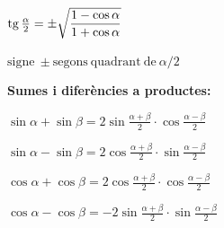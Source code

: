 \begin{bluebox}
\begin{minipage}{0.5\textwidth}
 \quad [16]\; $   \mathrm{tg}\,\frac{\alpha}{2} =\pm \sqrt{\dfrac{1-\cos \alpha}{1+\cos \alpha} } $ 
 
 \end{minipage}
\begin{minipage}{0.4\textwidth}
$\mathrm{signe\ \pm segons\ quadrant\ de\ } \alpha/2$ 
\end{minipage}

 
 
 
 
 \textbf{Sumes i diferències a  productes:}
 
 \quad [17]\; $  \sin \alpha+\sin \beta=2\sin \frac{\alpha+\beta}{2} \cdot \cos \frac{\alpha-\beta}{2} $ 
 
 \quad [18]\; $  \sin \alpha-\sin \beta=2\cos \frac{\alpha+\beta}{2} \cdot \sin \frac{\alpha-\beta}{2} $ 
 
 \quad [19]\; $  \cos \alpha+\cos \beta=2\cos \frac{\alpha+\beta}{2} \cdot \cos \frac{\alpha-\beta}{2} $ 
 
\quad [20]\; $  \cos \alpha-\cos \beta=-2\sin \frac{\alpha+\beta}{2} \cdot \sin \frac{\alpha-\beta}{2} $ 
 \end{bluebox}
 
 
 \begin{extrapage}
		
 	
 \end{extrapage}